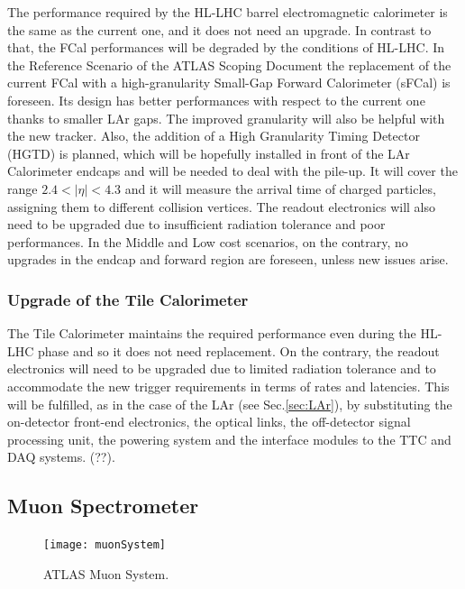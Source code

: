 \documentclass[a4paper,twoside,12pt]{article}
\begin{document}
The performance required by the HL-LHC barrel electromagnetic calorimeter is the same as the current one, and it does not need an upgrade. In contrast to that, the FCal performances will be degraded by the conditions of HL-LHC. In the Reference Scenario of the ATLAS Scoping Document\cite{scoping} the replacement of the current FCal with a high-granularity Small-Gap Forward Calorimeter (sFCal) is foreseen. Its design has better performances with respect to the current one thanks to smaller LAr gaps. The improved granularity will also be helpful with the new 
tracker. Also, the addition of a High Granularity Timing Detector (HGTD) is planned, which will be hopefully installed in front of the LAr Calorimeter endcaps and will be needed to deal with the
pile-up. It will cover the range $2.4 < |\eta| < 4.3$ and it will measure the arrival time of charged particles, assigning them to different collision vertices. The readout electronics will also need to be upgraded due to insufficient radiation tolerance and poor performances. In the Middle and Low cost 
scenarios, on the contrary, no upgrades in the endcap and forward region are foreseen, unless new issues arise. \\

\subsubsection*{Upgrade of the Tile Calorimeter}

The Tile Calorimeter maintains the required performance even during the HL-LHC phase and
so it does not need replacement. On the contrary, the readout electronics will need to be upgraded due to limited radiation tolerance and to accommodate the new trigger requirements in terms of rates and latencies. This will be fulfilled, as in the case of the LAr (see
Sec.\ref{sec:LAr}), by substituting the on-detector front-end electronics, the optical links, the off-detector signal processing unit, the powering system and the interface modules to the TTC and DAQ systems. (??).

\subsection{Muon Spectrometer}\label{sec:muon}\cite{muon_tdr}\cite{Aad:2008zzm}

\begin{figure} [h]
	\centering
	\texttt{[image: muonSystem]}
	\caption{ATLAS Muon System\cite{muon_tdr}.}
	\label{fig:muonSystem}
\end{figure}
\end{document}
